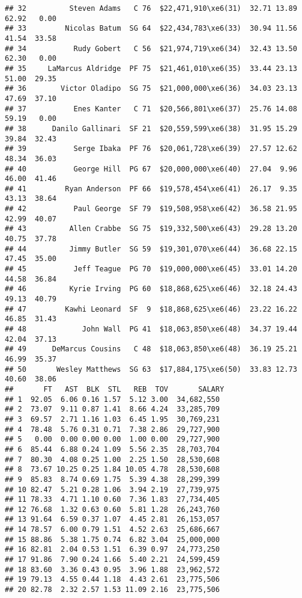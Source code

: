 \documentclass[
]{article}
\begin{document}
\begin{verbatim}
## 32          Steven Adams   C 76  $22,471,910\xe6(31)  32.71 13.89 62.92   0.00
## 33         Nicolas Batum  SG 64  $22,434,783\xe6(33)  30.94 11.56 41.54  33.58
## 34           Rudy Gobert   C 56  $21,974,719\xe6(34)  32.43 13.50 62.30   0.00
## 35     LaMarcus Aldridge  PF 75  $21,461,010\xe6(35)  33.44 23.13 51.00  29.35
## 36        Victor Oladipo  SG 75  $21,000,000\xe6(36)  34.03 23.13 47.69  37.10
## 37           Enes Kanter   C 71  $20,566,801\xe6(37)  25.76 14.08 59.19   0.00
## 38      Danilo Gallinari  SF 21  $20,559,599\xe6(38)  31.95 15.29 39.84  32.43
## 39           Serge Ibaka  PF 76  $20,061,728\xe6(39)  27.57 12.62 48.34  36.03
## 40           George Hill  PG 67  $20,000,000\xe6(40)  27.04  9.96 46.00  41.46
## 41         Ryan Anderson  PF 66  $19,578,454\xe6(41)  26.17  9.35 43.13  38.64
## 42           Paul George  SF 79  $19,508,958\xe6(42)  36.58 21.95 42.99  40.07
## 43          Allen Crabbe  SG 75  $19,332,500\xe6(43)  29.28 13.20 40.75  37.78
## 44          Jimmy Butler  SG 59  $19,301,070\xe6(44)  36.68 22.15 47.45  35.00
## 45           Jeff Teague  PG 70  $19,000,000\xe6(45)  33.01 14.20 44.58  36.84
## 46          Kyrie Irving  PG 60  $18,868,625\xe6(46)  32.18 24.43 49.13  40.79
## 47         Kawhi Leonard  SF  9  $18,868,625\xe6(46)  23.22 16.22 46.85  31.43
## 48             John Wall  PG 41  $18,063,850\xe6(48)  34.37 19.44 42.04  37.13
## 49      DeMarcus Cousins   C 48  $18,063,850\xe6(48)  36.19 25.21 46.99  35.37
## 50       Wesley Matthews  SG 63  $17,884,175\xe6(50)  33.83 12.73 40.60  38.06
##       FT   AST  BLK  STL   REB  TOV       SALARY
## 1  92.05  6.06 0.16 1.57  5.12 3.00  34,682,550 
## 2  73.07  9.11 0.87 1.41  8.66 4.24  33,285,709 
## 3  69.57  2.71 1.16 1.03  6.45 1.95  30,769,231 
## 4  78.48  5.76 0.31 0.71  7.38 2.86  29,727,900 
## 5   0.00  0.00 0.00 0.00  1.00 0.00  29,727,900 
## 6  85.44  6.88 0.24 1.09  5.56 2.35  28,703,704 
## 7  80.30  4.08 0.25 1.00  2.25 1.50  28,530,608 
## 8  73.67 10.25 0.25 1.84 10.05 4.78  28,530,608 
## 9  85.83  8.74 0.69 1.75  5.39 4.38  28,299,399 
## 10 82.47  5.21 0.28 1.06  3.94 2.19  27,739,975 
## 11 78.33  4.71 1.10 0.60  7.36 1.83  27,734,405 
## 12 76.68  1.32 0.63 0.60  5.81 1.28  26,243,760 
## 13 91.64  6.59 0.37 1.07  4.45 2.81  26,153,057 
## 14 78.57  6.00 0.79 1.51  4.52 2.63  25,686,667 
## 15 88.86  5.38 1.75 0.74  6.82 3.04  25,000,000 
## 16 82.81  2.04 0.53 1.51  6.39 0.97  24,773,250 
## 17 91.86  7.90 0.24 1.66  5.40 2.21  24,599,459 
## 18 83.60  3.36 0.43 0.95  3.96 1.88  23,962,572 
## 19 79.13  4.55 0.44 1.18  4.43 2.61  23,775,506 
## 20 82.78  2.32 2.57 1.53 11.09 2.16  23,775,506 

\end{verbatim}
\end{document}
